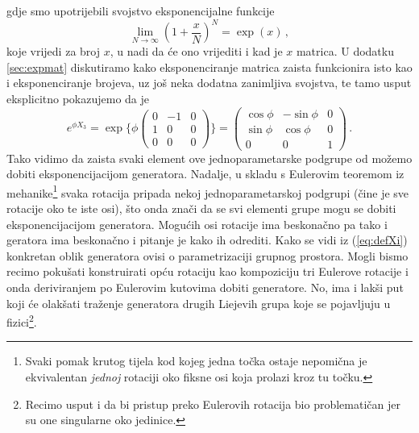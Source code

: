 gdje smo upotrijebili svojstvo eksponencijalne funkcije
\begin{equation}
    \lim_{N\to\infty}\left(1 + \frac{x}{N}\right)^N = \exp(x) \,,
\end{equation}
koje vrijedi za broj $x$,
u nadi da će ono vrijediti i kad je $x$ matrica.
U dodatku \ref{sec:expmat} diskutiramo
kako eksponenciranje matrica zaista funkcionira isto kao i
eksponenciranje brojeva, uz još neka dodatna zanimljiva svojstva,
te tamo usput eksplicitno pokazujemo da je
\begin{equation}
e^{\phi X_3} = \exp\Bigg\{ 
    \phi  \begin{pmatrix}
0 & -1 & 0 \\
1 & 0 & 0 \\
0 & 0 & 0 
\end{pmatrix}\Bigg\} =
\begin{pmatrix}
\cos\phi & -\sin\phi & 0 \\
\sin\phi & \cos\phi & 0 \\
0 & 0 & 1 \end{pmatrix} \,.
\end{equation}
Tako vidimo da zaista svaki element ove jednoparametarske podgrupe
od  možemo dobiti eksponencijacijom generatora.
Nadalje, u skladu s Eulerovim teoremom iz mehanike\footnote{Svaki pomak krutog
tijela kod kojeg jedna točka ostaje nepomična je ekvivalentan \emph{jednoj}
rotaciji oko fiksne osi koja prolazi kroz tu točku.} svaka  rotacija 
pripada nekoj jednoparametarskoj podgrupi
 (čine je sve rotacije oko te iste osi), što onda znači da se
svi elementi grupe  mogu se dobiti eksponencijacijom generatora.
Mogućih osi rotacije ima beskonačno pa tako i geratora ima beskonačno
i pitanje je kako ih odrediti.
Kako se vidi iz (\ref{eq:defXi}) konkretan oblik generatora ovisi
o parametrizaciji grupnog prostora. 
Mogli bismo recimo pokušati konstruirati opću rotaciju kao kompoziciju tri
 Eulerove rotacije i onda deriviranjem po Eulerovim kutovima dobiti
 generatore. No, ima i lakši put koji će olakšati traženje 
 generatora drugih Liejevih grupa koje se pojavljuju u fizici\footnote{Recimo
     usput i da bi pristup preko Eulerovih rotacija
     bio  problematičan jer su one singularne oko jedinice.}.

